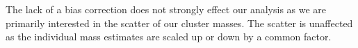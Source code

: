 The lack of a bias correction does not strongly effect our analysis as we are primarily interested in the scatter of our cluster masses. The scatter is unaffected as the individual mass estimates are scaled up or down by a common factor.

%

